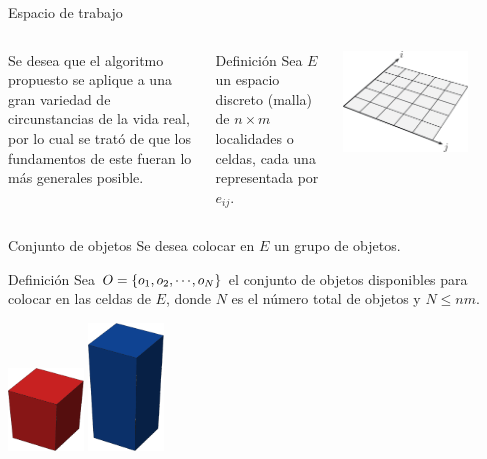 \documentclass[14pt, aspectratio = 1610, xcolor=table, structureblod]{beamer}
\begin{document}
\begin{frame}{Espacio de trabajo}
	\begin{columns}
	\vskip -20pt%
	\justifying Se desea que el algoritmo propuesto se aplique a una gran variedad de circunstancias de la vida real, por lo cual se trató de que los fundamentos de este fueran lo más generales posible.
	\vspace{-8pt}%
	\begin{block}{Definición}
		Sea $E$ un espacio discreto (malla) de $n\times m$ localidades o celdas, cada una representada por $e_{ij}$. 
	\end{block}
	\vskip -2pt%
	\centering
	\includegraphics[width = 0.74\textwidth]{ejes_malla}
	\end{columns}
\end{frame}


\begin{frame}{Conjunto de objetos}
	Se desea colocar en $E$ un grupo de objetos.
	\begin{block}{Definición}
		Sea $O = \{o_1, o_2, \cdots\hspace{-1pt}, o_N\}$ el conjunto de objetos disponibles para colocar en las celdas de $E$, donde $N$ es el número total de objetos y $N \leq nm$.
	\end{block}
	\vfill
	\centering
	\includegraphics[width=2cm]{cubo}
	\hskip 1.5cm%
	\includegraphics[width=2cm]{prisma}
\end{frame}
\end{document}
